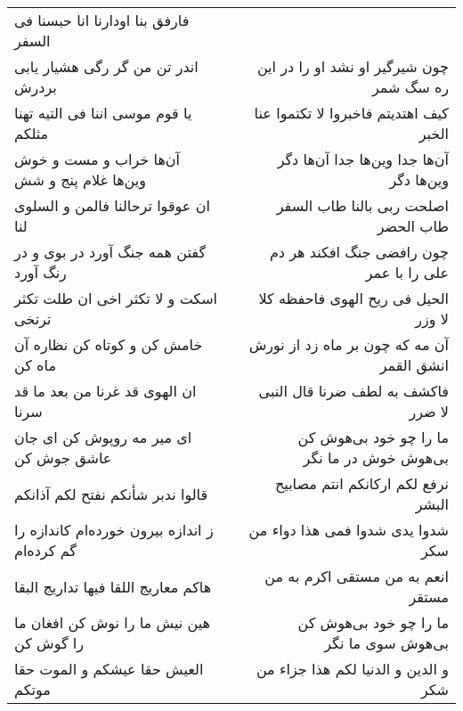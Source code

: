 \begin{center}
\begin{longtable}{l p{0.5cm} r}
فارفق بنا اودارنا انا حبسنا فی السفر
\\
اندر تن من گر رگی هشیار یابی بردرش
&&
چون شیرگیر او نشد او را در این ره سگ شمر
\\
یا قوم موسی اننا فی التیه تهنا مثلکم
&&
کیف اهتدیتم فاخبروا لا تکتموا عنا الخبر
\\
آن‌ها خراب و مست و خوش وین‌ها غلام پنج و شش
&&
آن‌ها جدا وین‌ها جدا آن‌ها دگر وین‌ها دگر
\\
ان عوقوا ترحالنا فالمن و السلوی لنا
&&
اصلحت ربی بالنا طاب السفر طاب الحضر
\\
گفتن همه جنگ آورد در بوی و در رنگ آورد
&&
چون رافضی جنگ افکند هر دم علی را با عمر
\\
اسکت و لا تکثر اخی ان طلت تکثر ترتخی
&&
الحیل فی ریح الهوی فاحفظه کلا لا وزر
\\
خامش کن و کوتاه کن نظاره آن ماه کن
&&
آن مه که چون بر ماه زد از نورش انشق القمر
\\
ان الهوی قد غرنا من بعد ما قد سرنا
&&
فاکشف به لطف ضرنا قال النبی لا ضرر
\\
ای میر مه روپوش کن ای جان عاشق جوش کن
&&
ما را چو خود بی‌هوش کن بی‌هوش خوش در ما نگر
\\
قالوا ندبر شأنکم نفتح لکم آذانکم
&&
نرفع لکم ارکانکم انتم مصابیح البشر
\\
ز اندازه بیرون خورده‌ام کاندازه را گم کرده‌ام
&&
شدوا یدی شدوا فمی هذا دواء من سکر
\\
هاکم معاریج اللقا فیها تداریج البقا
&&
انعم به من مستقی اکرم به من مستقر
\\
هین نیش ما را نوش کن افغان ما را گوش کن
&&
ما را چو خود بی‌هوش کن بی‌هوش سوی ما نگر
\\
العیش حقا عیشکم و الموت حقا موتکم
&&
و الدین و الدنیا لکم هذا جزاء من شکر
\\
\end{longtable}
\end{center}
